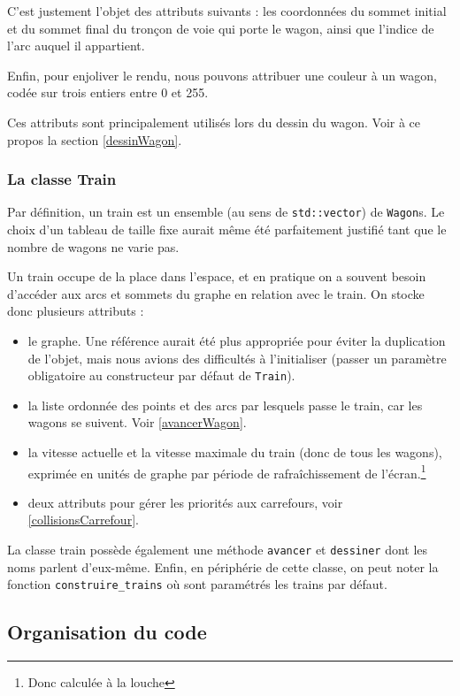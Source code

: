 \documentclass[a4paper, oneside, 11pt, twocolumn]{article}
\begin{document}
C'est justement l'objet des attributs suivants : les coordonnées du sommet initial et du sommet final du tronçon de voie qui porte le wagon, ainsi que l'indice de l'arc auquel il appartient.

Enfin, pour enjoliver le rendu, nous pouvons attribuer une couleur à un wagon, codée sur trois entiers entre 0 et 255.

Ces attributs sont principalement utilisés lors du dessin du wagon. Voir à ce propos la section \ref{dessinWagon}.

\subsubsection{La classe Train}

Par définition, un train est un ensemble (au sens de \texttt{std::vector}) de \texttt{Wagon}s. Le choix d'un tableau de taille fixe aurait même été parfaitement justifié tant que le nombre de wagons ne varie pas.

Un train occupe de la place dans l'espace, et en pratique on a souvent besoin d'accéder aux arcs et sommets du graphe en relation avec le train. On stocke donc plusieurs attributs :

\begin{itemize}
\item le graphe. Une référence aurait été plus appropriée pour éviter la duplication de l'objet, mais nous avions des difficultés à l'initialiser (passer un paramètre obligatoire au constructeur par défaut de \texttt{Train}).
\item la liste ordonnée des points et des arcs par lesquels passe le train, car les wagons se suivent. Voir \ref{avancerWagon}.
\item la vitesse actuelle et la vitesse maximale du train (donc de tous les wagons), exprimée en unités de graphe par période de rafraîchissement de l'écran.\footnote{Donc calculée à la louche}
\item deux attributs pour gérer les priorités aux carrefours, voir \ref{collisionsCarrefour}.
\end{itemize}

La classe train possède également une méthode \texttt{avancer} et \texttt{dessiner} dont les noms parlent d'eux-même. Enfin, en périphérie de cette classe, on peut noter la fonction \texttt{construire\_trains} où sont paramétrés les trains par défaut.

\subsection{Organisation du code}
\end{document}
